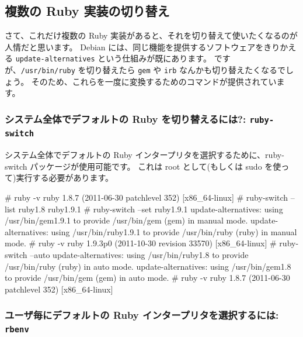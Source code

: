 \documentclass[mingoth,a4paper]{jsarticle}
\begin{document}
\subsection{複数の Ruby 実装の切り替え}

さて、これだけ複数の Ruby 実装があると、それを切り替えて使いたくなるのが人情だと思います。
Debian には、同じ機能を提供するソフトウェアをきりかえる \texttt{update-alternatives} という仕組みが既にあります。
ですが、\texttt{/usr/bin/ruby} を切り替えたら \texttt{gem} や \texttt{irb} なんかも切り替えたくなるでしょう。
そのため、これらを一度に変換するためのコマンドが提供されています。

\subsubsection{システム全体でデフォルトの Ruby を切り替えるには?: \texttt{ruby-switch}}

システム全体でデフォルトの Ruby インタープリタを選択するために、ruby-switch パッケージが使用可能です。 これは root として(もしくは sudo を使って)実行する必要があります。
\begin{commandline}
# ruby -v
ruby 1.8.7 (2011-06-30 patchlevel 352) [x86_64-linux]
# ruby-switch --list
ruby1.8
ruby1.9.1
# ruby-switch --set ruby1.9.1
update-alternatives: using /usr/bin/gem1.9.1 to provide /usr/bin/gem (gem) in manual mode.
update-alternatives: using /usr/bin/ruby1.9.1 to provide /usr/bin/ruby (ruby) in manual mode.
# ruby -v
ruby 1.9.3p0 (2011-10-30 revision 33570) [x86_64-linux]
# ruby-switch --auto
update-alternatives: using /usr/bin/ruby1.8 to provide /usr/bin/ruby (ruby) in auto mode.
update-alternatives: using /usr/bin/gem1.8 to provide /usr/bin/gem (gem) in auto mode.
# ruby -v
ruby 1.8.7 (2011-06-30 patchlevel 352) [x86_64-linux]
\end{commandline}

\subsubsection{ユーザ毎にデフォルトの Ruby インタープリタを選択するには: \texttt{rbenv}}
\end{document}
